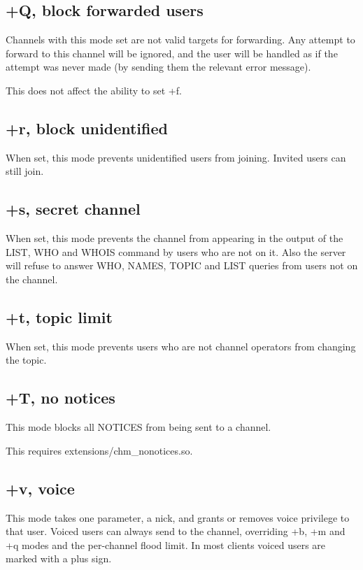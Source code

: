 \subsection{+Q, block forwarded users}

	Channels with this mode set are not valid targets for forwarding. Any
	attempt to forward to this channel will be ignored, and the user will
	be handled as if the attempt was never made (by	sending them the
	relevant error message).

	This does not affect the ability to set +f.


\subsection{+r, block unidentified}

	When set, this mode prevents unidentified users from joining. Invited
	users can still join.


\subsection{+s, secret channel}

	When set, this mode prevents the channel from appearing in the output
	of the LIST, WHO and WHOIS command by users who are not on it. Also
	the server will refuse to answer WHO, NAMES, TOPIC and LIST queries
	from users not on the channel.


\subsection{+t, topic limit}

	When set, this mode prevents users who are not channel operators from
	changing the topic.


\subsection{+T, no notices}

	This mode blocks all NOTICES from being sent to a channel.


	This requires extensions/chm\_nonotices.so.


\subsection{+v, voice}

	This mode takes one parameter, a nick, and grants or removes voice
	privilege to that user. Voiced users can always send to the channel,
	overriding +b, +m and +q modes and the per-{}channel flood limit. In
	most clients voiced users are marked with a plus sign.


